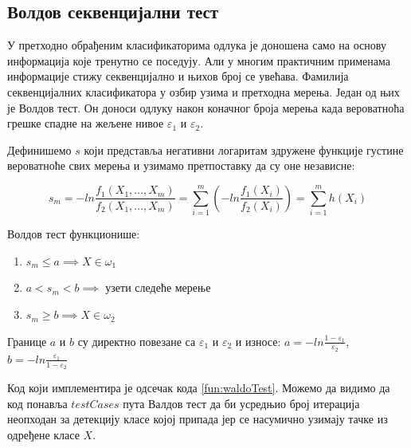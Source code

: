 \subsection{Волдов секвенцијални тест}

У претходно обрађеним класификаторима одлука је доношена само на основу информација које тренутно се поседују. Али у многим практичним применама информације стижу секвенцијално и њихов број се увећава. Фамилија секвенцијалних класификатора у озбир узима и претходна мерења. Један од њих је Волдов тест. Он доноси одлуку након коначног броја мерења када вероватноћа грешке спадне на жељене нивое $\varepsilon_1$ и $\varepsilon_2$.

Дефинишемо $s$ који представља негативни логаритам здружене функције густине вероватноће свих мерења и узимамо претпоставку да су оне независне:

$$s_m = -ln\frac{f_1(X_1, ..., X_m)}{f_2(X_1, ..., X_m)} = \sum_{i=1}^m \left( -ln\frac{f_1(X_i)}{f_2(X_i)}\right) = \sum_{i=1}^mh(X_i)$$

Волдов тест функционише:
\begin{enumerate}[1)]
\item $s_m \leq a \implies X \in \omega_1$
\item $a < s_m < b \implies $ узети следеће мерење
\item $s_m \geq b \implies X \in \omega_2$
\end{enumerate}

Границе $a$ и $b$ су директно повезане са $\varepsilon_1$ и $\varepsilon_2$ и износе:
$a=-ln\frac{1-\varepsilon_1}{\varepsilon_2}$, $b =-ln\frac{\varepsilon_1}{1-\varepsilon_2}$

Код који имплементира је одсечак кода \ref{fun:waldoTest}. Можемо да видимо да код понавља $testCases$ пута Валдов тест да би усредњио број итерација неопходан за детекцију класе којој припада јер се насумично узимају тачке из одређене класе $X$. 

